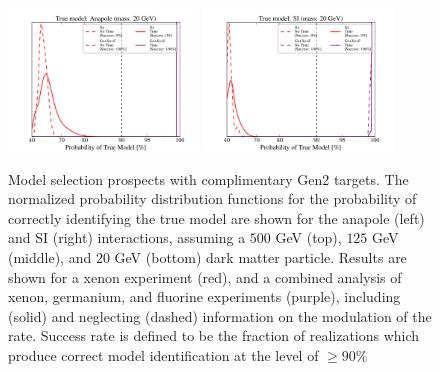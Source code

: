 \documentclass[11pt]{article}
\begin{document}
\begin{figure}
\includegraphics[width=0.45\textwidth]{plots/PDF_Single_20GeV_Anapole_50sims_Xe_vs_FGeXe_GF_TNT.pdf}
\includegraphics[width=0.45\textwidth]{plots/PDF_Single_20GeV_SI_Higgs_50sims_Xe_vs_FGeXe_GF_TNT.pdf}
\caption{\label{fig:gen2}
Model selection prospects with complimentary Gen2 targets. The normalized probability distribution functions for the probability of correctly identifying the true model are shown for the anapole (left) and SI (right) interactions, assuming a $500$ GeV (top), $125$ GeV (middle), and $20$ GeV (bottom) dark matter particle. Results are shown for a xenon experiment (red), and a combined analysis of xenon, germanium, and fluorine experiments (purple), including (solid) and neglecting (dashed) information on the modulation of the rate. Success rate is defined to be the fraction of realizations which produce correct model identification at the level of $ \geq 90\%$}
\end{figure}
\end{document}
